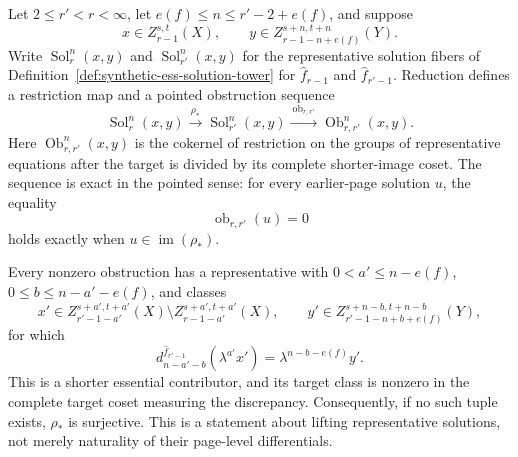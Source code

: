 \begin{lemma}
  \label{lem:page-extension-restriction-exact-obstruction}
  \notready
  Let $2\le r'<r<\infty$, let
  $e(f)\le n\le r'-2+e(f)$, and suppose
  \[
    x\in Z_{r-1}^{s,t}(X),\qquad
    y\in Z_{r-1-n+e(f)}^{s+n,t+n}(Y).
  \]
  Write $\operatorname{Sol}_{r}^{n}(x,y)$ and
  $\operatorname{Sol}_{r'}^{n}(x,y)$ for the representative solution fibers
  of Definition~\ref{def:synthetic-ess-solution-tower} for
  $\widehat f_{r-1}$ and $\widehat f_{r'-1}$.  Reduction defines a restriction
  map and a pointed obstruction sequence
  \[
    \operatorname{Sol}_{r}^{n}(x,y)
      \xrightarrow{\ \rho_*\ }
    \operatorname{Sol}_{r'}^{n}(x,y)
      \xrightarrow{\ \operatorname{ob}_{r,r'}\ }
    \operatorname{Ob}_{r,r'}^{n}(x,y).
  \]
  Here $\operatorname{Ob}_{r,r'}^{n}(x,y)$ is the cokernel of restriction on
  the groups of representative equations after the target is divided by its
  complete shorter-image coset.  The sequence is exact in the pointed sense:
  for every earlier-page solution $u$, the equality
  \[
    \operatorname{ob}_{r,r'}(u)=0
  \]
  holds exactly when $u\in\operatorname{im}(\rho_*)$.

  Every nonzero obstruction has a representative with
  $0<a'\le n-e(f)$, $0\le b\le n-a'-e(f)$, and classes
  \[
    x'\in Z_{r'-1-a'}^{s+a',t+a'}(X)
       \setminus Z_{r-1-a'}^{s+a',t+a'}(X),
    \qquad
    y'\in Z_{r'-1-n+b+e(f)}^{s+n-b,t+n-b}(Y),
  \]
  for which
  \[
    d_{n-a'-b}^{\widehat f_{r'-1}}(\lambda^{a'}x')
       =\lambda^{n-b-e(f)}y'.
  \]
  This is a shorter essential contributor, and its target class is nonzero in
  the complete target coset measuring the discrepancy.  Consequently, if no
  such tuple exists, $\rho_*$ is surjective.  This is a statement about lifting
  representative solutions, not merely naturality of their page-level
  differentials.
\end{lemma}

